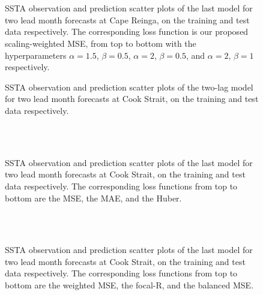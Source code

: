 \documentclass[11pt, a4paper]{article}
\begin{document}
\begin{figure}[H]
\centering
{}
\\
\\
\caption{SSTA observation and prediction scatter plots of the last model for two lead month forecasts at Cape Reinga, on the training and test data respectively. The corresponding loss function is our proposed scaling-weighted MSE, from top to bottom with the hyperparameters $\alpha=1.5$, $\beta=0.5$, $\alpha=2$, $\beta=0.5$, and $\alpha=2$, $\beta=1$ respectively.}
\end{figure}

\begin{figure}[H]
\centering
{}
\caption{SSTA observation and prediction scatter plots of the two-lag model for two lead month forecasts at Cook Strait, on the training and test data respectively.}
\end{figure}

\begin{figure}[H]
\centering
{}
\\
\\
\caption{SSTA observation and prediction scatter plots of the last model for two lead month forecasts at Cook Strait, on the training and test data respectively. The corresponding loss functions from top to bottom are the MSE, the MAE, and the Huber.}
\end{figure}

\begin{figure}[H]
\centering
{}
\\
\\
\caption{SSTA observation and prediction scatter plots of the last model for two lead month forecasts at Cook Strait, on the training and test data respectively. The corresponding loss functions from top to bottom are the weighted MSE, the focal-R, and the balanced MSE.}
\end{figure}
\end{document}
